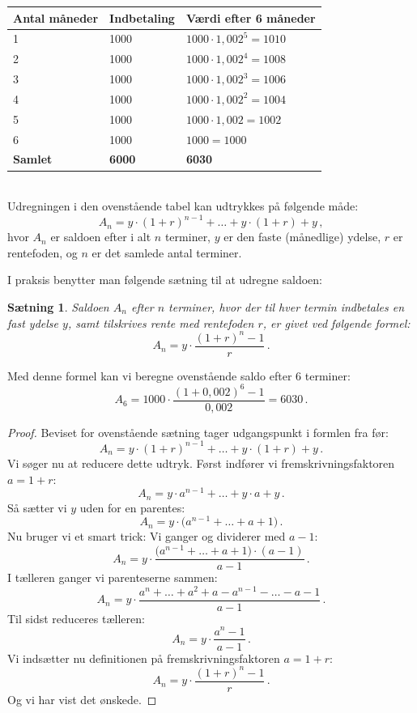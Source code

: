 \documentclass[12pt,oneside,a4paper]{article}
\newtheorem{thm}{Sætning}[section]
\begin{document}
\begin{tabular}{|l|l|l|}
    \hline
    \textbf{Antal måneder} & \textbf{Indbetaling} & \textbf{Værdi efter 6 måneder} \\
    \hline
    1 & 1000 & $1000 \cdot 1,002^5 = 1010$ \\
    \hline
    2 & 1000 & $1000 \cdot 1,002^4 = 1008$ \\
    \hline
    3 & 1000 & $1000 \cdot 1,002^3 = 1006$ \\
    \hline
    4 & 1000 & $1000 \cdot 1,002^2 = 1004$ \\
    \hline
    5 & 1000 & $1000 \cdot 1,002 = 1002$ \\
    \hline
    6 & 1000 & $1000 = 1000$ \\
    \hline
    \textbf{Samlet} & \textbf{6000} & \textbf{6030} \\
    \hline
\end{tabular}
\\

Udregningen i den ovenstående tabel kan udtrykkes på følgende måde:
\[
A_n = y\cdot(1+r)^{n-1} + \ldots + y\cdot(1+r) + y \,,
\]
hvor $A_n$ er saldoen efter i alt $n$ terminer,  $y$ er den faste (månedlige)
ydelse, $r$ er rentefoden, og $n$ er det samlede antal terminer.

I praksis benytter man følgende sætning til at udregne saldoen:
\begin{tcolorbox}
\begin{thm}
Saldoen $A_n$ efter $n$ terminer, hvor der til hver termin indbetales en fast ydelse $y$,
samt tilskrives rente med rentefoden $r$, er givet ved følgende formel:
\[
A_n = y\cdot\frac{(1+r)^n-1}{r}\,.
\]
\end{thm}
\end{tcolorbox}

Med denne formel kan vi beregne ovenstående saldo efter 6 terminer:
\[
A_6 = 1000\cdot\frac{(1+0,002)^6-1}{0,002} = 6030 \,.
\]

\begin{tcolorbox}
\begin{proof}
Beviset for ovenstående sætning tager udgangspunkt i formlen fra før:
\[
A_n = y\cdot(1+r)^{n-1} + \ldots + y\cdot(1+r) + y \,.
\]
Vi søger nu at reducere dette udtryk. Først indfører vi fremskrivningsfaktoren $a=1+r$:
\[
A_n = y\cdot a^{n-1} + \ldots + y\cdot a + y \,.
\]
Så sætter vi $y$ uden for en parentes:
\[
A_n = y\cdot\big(a^{n-1} + \ldots + a + 1\big) \,.
\]
Nu bruger vi et smart trick: Vi ganger og dividerer med $a-1$:
\[
A_n = y\cdot\frac{\big(a^{n-1} + \ldots + a + 1\big)\cdot(a-1)}{a-1} \,.
\]
I tælleren ganger vi parenteserne sammen:
\[
A_n = y\cdot\frac{a^{n} + \ldots + a^2 + a - a^{n-1} - \ldots - a - 1}{a-1} \,.
\]
Til sidst reduceres tælleren:
\[
A_n = y\cdot\frac{a^{n} - 1}{a-1} \,.
\]
Vi indsætter nu definitionen på fremskrivningsfaktoren $a=1+r$:
\[
A_n = y\cdot\frac{(1+r)^{n} - 1}{r} \,.
\]
Og vi har vist det ønskede.
\end{proof}
\end{tcolorbox}
\end{document}

